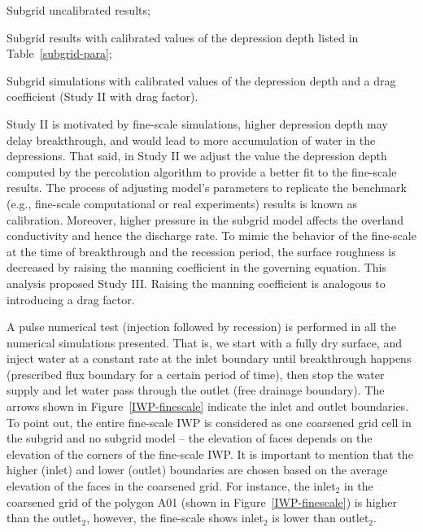 \documentclass[review,11pt]{elsarticle}
\begin{document}
\begin{description}\itemsep0pt \parskip0pt
\item [Study I:] Subgrid uncalibrated results;
\item [Study II:] Subgrid results with calibrated values of the depression depth listed in Table~\ref{subgrid-para};
\item [Study III:] Subgrid simulations with calibrated values of the depression depth and a drag coefficient (Study II with drag factor).
\end{description}

Study II is motivated by fine-scale simulations, higher depression depth may delay breakthrough, and would lead to more accumulation of water in the depressions. That said, in Study II we adjust the value the depression depth computed by the percolation algorithm to provide a better fit to the fine-scale results. The process of adjusting model's parameters to replicate the benchmark (e.g., fine-scale computational or real experiments) results is known as calibration. Moreover, higher pressure in the subgrid model affects the overland conductivity and hence the discharge rate. To mimic the behavior of the fine-scale at the time of breakthrough and the recession period, the surface roughness is decreased by raising the manning coefficient in the governing equation. This analysis proposed Study III. Raising the manning coefficient is analogous to introducing a drag factor.

A pulse numerical test (injection followed by recession) is performed in all the numerical simulations presented. That is, we start with a fully dry surface, and inject water at a constant rate at the inlet boundary until breakthrough happens (prescribed flux boundary for a certain period of time), then stop the water supply and let water pass through the outlet (free drainage boundary). The arrows shown in Figure~\ref{IWP-finescale} indicate the inlet and outlet boundaries. 
To point out, the entire fine-scale IWP is considered as one coarsened grid cell in the subgrid and no subgrid model -- the elevation of faces depends on the elevation of the corners of the fine-scale IWP.  It is important to mention that the higher (inlet) and lower (outlet) boundaries are chosen based on the average elevation of the faces in the coarsened grid. For instance, the inlet$_2$ in the coarsened grid of the polygon A01 (shown in Figure~\ref{IWP-finescale}) is higher than the outlet$_2$, however, the fine-scale shows inlet$_2$ is lower than outlet$_2$. 
\end{document}

